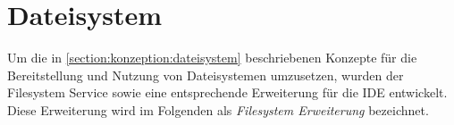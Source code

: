 \section{Dateisystem}\label{section:prototypische-implementierung:dateisystem}


Um die in \autoref{section:konzeption:dateisystem} beschriebenen Konzepte für die Bereitstellung und Nutzung von Dateisystemen umzusetzen, wurden der Filesystem Service sowie eine entsprechende Erweiterung für die IDE entwickelt. Diese Erweiterung wird im Folgenden als \textit{Filesystem Erweiterung} bezeichnet.

